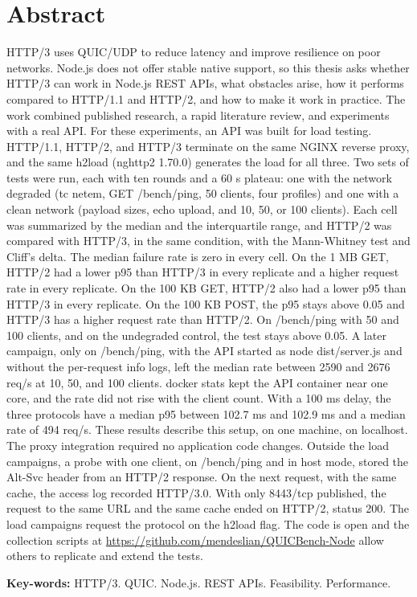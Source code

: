 \chapter*{Abstract}

HTTP/3 uses QUIC/UDP to reduce latency and improve resilience on poor networks. Node.js does not offer stable native support, so this thesis asks whether HTTP/3 can work in Node.js REST APIs, what obstacles arise, how it performs compared to HTTP/1.1 and HTTP/2, and how to make it work in practice. The work combined published research, a rapid literature review, and experiments with a real API. For these experiments, an API was built for load testing. HTTP/1.1, HTTP/2, and HTTP/3 terminate on the same NGINX reverse proxy, and the same h2load (nghttp2 1.70.0) generates the load for all three. Two sets of tests were run, each with ten rounds and a 60 s plateau: one with the network degraded (tc netem, GET /bench/ping, 50 clients, four profiles) and one with a clean network (payload sizes, echo upload, and 10, 50, or 100 clients). Each cell was summarized by the median and the interquartile range, and HTTP/2 was compared with HTTP/3, in the same condition, with the Mann-Whitney test and Cliff's delta. The median failure rate is zero in every cell. On the 1 MB GET, HTTP/2 had a lower p95 than HTTP/3 in every replicate and a higher request rate in every replicate. On the 100 KB GET, HTTP/2 also had a lower p95 than HTTP/3 in every replicate. On the 100 KB POST, the p95 stays above 0.05 and HTTP/3 has a higher request rate than HTTP/2. On /bench/ping with 50 and 100 clients, and on the undegraded control, the test stays above 0.05. A later campaign, only on /bench/ping, with the API started as node dist/server.js and without the per-request info logs, left the median rate between 2590 and 2676 req/s at 10, 50, and 100 clients. docker stats kept the API container near one core, and the rate did not rise with the client count. With a 100 ms delay, the three protocols have a median p95 between 102.7 ms and 102.9 ms and a median rate of 494 req/s. These results describe this setup, on one machine, on localhost. The proxy integration required no application code changes. Outside the load campaigns, a probe with one client, on /bench/ping and in host mode, stored the Alt-Svc header from an HTTP/2 response. On the next request, with the same cache, the access log recorded HTTP/3.0. With only 8443/tcp published, the request to the same URL and the same cache ended on HTTP/2, status 200. The load campaigns request the protocol on the h2load flag. The code is open and the collection scripts at \url{https://github.com/mendeslian/QUICBench-Node} allow others to replicate and extend the tests.

\noindent\textbf{Key-words:} HTTP/3. QUIC. Node.js. REST APIs. Feasibility. Performance.
